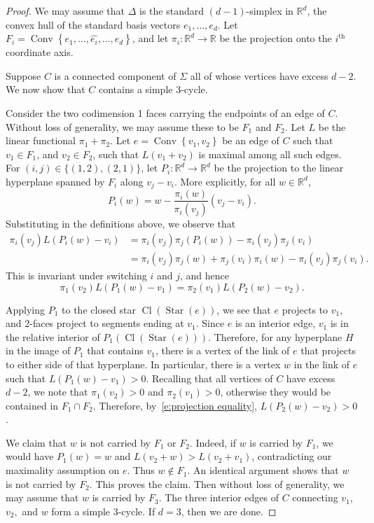 \documentclass[ALCO,ThmDefs,Unicode,epreuves]{cedram}
\newcommand\R{\mathbb{R}}
\DeclareMathOperator{\Cl}{Cl}
\DeclareMathOperator{\Convop}{Conv}
\newcommand{\Conv}[1]{\Convop\left\{{#1}\right\}}
\DeclareMathOperator{\Star}{Star}
\begin{document}
\begin{proof}
We may assume that $\Delta$ is the standard $(d-1)$-simplex in $\R^{d}$, \ie 
the convex hull of the standard basis vectors $e_1,\ldots,e_{d}$. Let
$F_i = \Conv{e_1,\ldots,\widehat{e_i},\ldots,e_{d}}$, and let 
$\pi_i : \R^d \to \R$ be the projection onto the $i^{\mathrm{th}}$ coordinate axis.

Suppose $C$ is a connected component of $\Sigma$ all of whose vertices have excess $d-2$. 
We now show that $C$ contains a simple 3-cycle. 

Consider the two codimension 1 faces carrying the endpoints of an edge of $C$. Without 
loss of generality, we may assume these to be $F_1$ and $F_2$. Let $L$ be the linear 
functional $ \pi_1 + \pi_2$. Let $e= \Conv{v_1, v_2}$ be an edge of $C$ such that 
$v_1 \in F_1$, and $v_2 \in F_2$, such that $L(v_1 + v_2)$ is maximal among all such 
edges. 
For $(i,j) \in \{(1,2),(2,1)\}$, let $P_i : \R^{d}\to\R^d$ be the projection to the 
linear hyperplane spanned by $F_i$ along $v_j-v_i$. 
More explicitly, for all $w \in \R^{d}$,
\[
P_i(w) = w - \frac{\pi_i(w)}{\pi_i(v_j)}(v_j - v_i).
\]
Substituting in the definitions above, we observe that 
\begin{align*}
\pi_i(v_j)L(P_i(w) - v_i) & = \pi_i(v_j)\pi_j(P_i(w)) - \pi_i(v_j)\pi_j(v_i) \\
& = \pi_i(v_j)\pi_j(w) + \pi_j(v_i)\pi_i(w) - \pi_i(v_j) \pi_j(v_i).
\end{align*}
This is invariant under switching $i$ and $j$, and hence
\begin{equation}\label{e:projection equality}
\pi_1(v_2)L(P_1(w) - v_1) = \pi_2(v_1)L(P_2(w) - v_2).
\end{equation}

Applying $P_1$ to the closed star $\Cl(\Star(e))$, we see that $e$ projects to $v_1$, and 
2-faces project to segments ending at $v_1$. Since $e$ is an interior edge, $v_1$ is in 
the relative interior of $P_1(\Cl(\Star(e)))$. Therefore, 
for any hyperplane $H$ in the image of $P_1$ that contains $v_1$, there is a vertex of 
the link of $e$ that projects to either side of that hyperplane. In particular,
there is a vertex $w$ in the link of $e$ such that $L(P_1(w) - v_1) > 0$. 
Recalling that all vertices of $C$ have excess $d-2$, we note that 
$\pi_1(v_2)>0$ and $\pi_2(v_1)>0$, otherwise they would be contained in 
$F_1\cap F_2$.
Therefore, by~\eqref{e:projection equality}, $L(P_2(w) - v_2) > 0$. 

We claim that $w$ is not carried by $F_1$ or $F_2$. 
Indeed, if $w$ is carried by $F_1$, we would have $P_1(w) = w$ and 
$L(v_2 + w) > L(v_2 + v_1)$, contradicting our maximality assumption on $e$. Thus 
$w \notin F_1$. An identical argument shows that $w$ is not carried by $F_2$. This proves 
the claim. Then without loss of generality, we may assume that $w$ is carried by $F_3$. 
The three interior edges of $C$ connecting $v_1$, $v_2,$ and $w$ form a simple 3-cycle. 
If $d = 3$, then we are done.


\end{proof}
\end{document}
